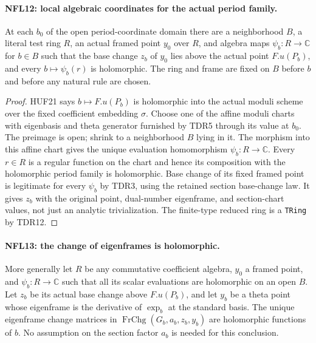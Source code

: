 \paragraph{NFL12: local algebraic coordinates for the actual period family.}
\label{claim:NFL12}
At each $b_0$ of the open period-coordinate domain there are a
neighborhood $B$, a literal test ring $R$, an actual framed point
$y_0$ over $R$, and algebra maps $\psi_b:R\to\mathbb C$ for
$b\in B$ such that the base change $z_b$ of $y_0$ lies above
the actual point $F.u(P_b)$, and every $b\mapsto\psi_b(r)$ is
holomorphic.  The ring and frame are fixed on $B$ before $b$
and before any natural rule are chosen.

\begin{proof}
HUF21 says $b\mapsto F.u(P_b)$ is holomorphic into the actual
moduli scheme over the fixed coefficient embedding $\sigma$.
Choose one of the affine moduli charts with eigenbasis and
theta generator furnished by TDR5 through its value at $b_0$.
The preimage is open; shrink to a neighborhood $B$ lying in it.
The morphism into this affine chart gives the unique evaluation
homomorphism $\psi_b:R\to\mathbb C$.  Every $r\in R$ is a
regular function on the chart and hence its composition with
the holomorphic period family is holomorphic.
Base change of its fixed framed point is legitimate for every
$\psi_b$ by TDR3, using the retained section base-change law.
It gives $z_b$ with the original point, dual-number eigenframe,
and section-chart values, not just an analytic trivialization.
The finite-type reduced ring is a \texttt{TRing} by TDR12.
\end{proof}

\paragraph{NFL13: the change of eigenframes is holomorphic.}
\label{claim:NFL13}
More generally let $R$ be any commutative coefficient algebra,
$y_0$ a framed point, and $\psi_b:R\to\mathbb C$ such that all
its scalar evaluations are holomorphic on an open $B$.
Let $z_b$ be its actual base change above $F.u(P_b)$, and let
$y_b$ be a theta point whose eigenframe is the derivative of
$\exp_b$ at the standard basis.  The unique eigenframe change
matrices in $\operatorname{FrChg}(G_b,a_b,z_b,y_b)$ are
holomorphic functions of $b$.  No assumption on the section
factor $a_b$ is needed for this conclusion.

